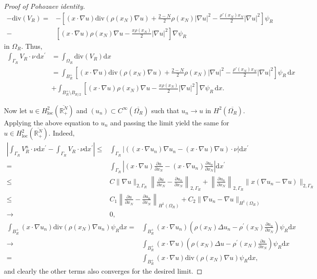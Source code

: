 \documentclass[12pt,reqno]{amsart}
\begin{document}
\begin{proof}[Proof of Pohozaev identity]
\begin{align*}
		    -\mathrm{div}(V_R)=&-\left[(x\cdot\nabla u)\mathrm{div}(\rho(x_N)\nabla u)+\frac{2-N}{2}\rho(x_N)|\nabla u|^2-\frac{\rho'(x_N)x_N}{2}|\nabla u|^2\right]\psi_R\\
            -&\left[(x\cdot\nabla u)\rho(x_N)\nabla u - \frac{x\rho(x_N)}{2}|\nabla u|^2\right]\nabla\psi_R
		\end{align*}
in $\Omega_{R}$. Thus,
\begin{align*}
\int_{\Gamma_R}V_{R}\cdot\nu\,\mathrm{d}x^\prime&=\int_{\Omega_R}\mathrm{div}(V_R)\mathrm{d}x\\
            &=\int_{ B_R^+}\left[(x\cdot\nabla u)\mathrm{div}(\rho(x_N)\nabla u)+\frac{2-N}{2}\rho(x_N)|\nabla u|^2-\frac{\rho'(x_N)x_N}{2}|\nabla u|^2\right]\psi_R\,\mathrm{d}x\\ 
			&+\int_{B_{R}^+\setminus B_{R/2}}\left[(x\cdot\nabla u)\rho(x_N)\nabla u - \frac{x\rho(x_N)}{2}|\nabla u|^2\right]\nabla\psi_{R}\,\mathrm{d}x.
\end{align*}

Now let $u \in H^2_{\mathrm{loc}}(\overline{\mathds{R}^N_+})$ and $(u_n) \subset C^\infty(\overline{\Omega_R})$ such that $u_n \to u$ in $H^2(\overline{\Omega_R})$. Applying the above equation to $u_n$ and passing the limit yield the same for $u \in H^2_{\mathrm{loc}}(\overline{\mathds{R}^N_+})$. Indeed, 
\begin{align*}
    \left|\int_{\Gamma_R}V_R^n\cdot\nu\mathrm{d}x^\prime-\int_{\Gamma_R}V_R\cdot\nu\mathrm{d}x^\prime\right|\leq&\int_{\Gamma_R} |((x\cdot\nabla u_n)\nabla u_n-(x\cdot\nabla u)\nabla u)\cdot \nu|\mathrm{d}x^\prime\\
    =&\int_{\Gamma_R} \left|(x\cdot\nabla u)\frac{\partial u}{\partial x_N}-(x\cdot \nabla u_n)\frac{\partial u_n}{\partial x_N}\right|\mathrm{d}x^\prime\\
    \leq& C\|\nabla u\|_{2,\Gamma_R}\left\|\frac{\partial u}{\partial x_N}-\frac{\partial u_n}{\partial x_N}\right\|_{2,\Gamma_R}+\left\| \frac{\partial u_n}{\partial x_N}\right\|_{2,\Gamma_R}\|x(\nabla u_n-\nabla u)\|_{2,\Gamma_R}\\
    \leq& C_1\left\|\frac{\partial u}{\partial x_N}-\frac{\partial u_n}{\partial x_N}\right\|_{H^1(\Omega_R)}+C_2\|\nabla u_n-\nabla u\|_{H^1(\Omega_R)}\\
    \longrightarrow& 0,
\end{align*}
\begin{align*}
    \int_{B_R^+}(x\cdot\nabla u_n)\mathrm{div}(\rho(x_N)\nabla u_n)\psi_R\mathrm{d}x=& \int_{B_R^+}(x\cdot\nabla u_n)\left(\rho(x_N)\Delta u_n-\rho^\prime(x_N)\frac{\partial u_n}{\partial x_N}\right)\psi_R\mathrm{d}x\\
    \longrightarrow& \int_{B_R^+}(x\cdot\nabla u)\left(\rho(x_N)\Delta u-\rho^\prime(x_N)\frac{\partial u}{\partial x_N}\right)\psi_R\mathrm{d}x\\
    =& \int_{B_R^+}(x\cdot\nabla u)\mathrm{div}(\rho(x_N)\nabla u)\psi_R\mathrm{d}x,
\end{align*}
and clearly the other terms also converges for the desired limit.


\end{proof}
\end{document}
